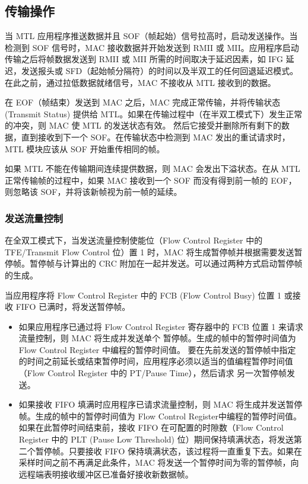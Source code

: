 \documentclass[main\_\_CN.tex]{subfiles}
\begin{document}
\subsection{传输操作}
当 MTL 应用程序推送数据并且 SOF（帧起始）信号拉高时，启动发送操作。当检测到 SOF 信号时，MAC 接收数据并开始发送到 RMII 或 MII。应用程序启动传输之后将帧数据发送到 RMII 或 MII 所需的时间取决于延迟因素，如 IFG 延迟，发送报头或 SFD（起始帧分隔符）的时间以及半双工的任何回退延迟模式。在此之前，通过拉低数据就绪信号，MAC 不接收从 MTL 接收到的数据。

在 EOF（帧结束）发送到 MAC 之后，MAC 完成正常传输，并将传输状态 (Transmit Status) 提供给 MTL。如果在传输过程中（在半双工模式下）发生正常的冲突，则 MAC 使 MTL 的发送状态有效。 然后它接受并删除所有剩下的数据，直到接收到下一个 SOF。在传输状态中检测到 MAC 发出的重试请求时，MTL 模块应该从 SOF 开始重传相同的帧。

如果 MTL 不能在传输期间连续提供数据，则 MAC 会发出下溢状态。在从 MTL 正常传输帧的过程中，如果 MAC 接收到一个 SOF 而没有得到前一帧的 EOF，则忽略该 SOF，并将该新帧视为前一帧的延续。

\subsubsection{发送流量控制 }
在全双工模式下，当发送流量控制使能位（Flow Control Register 中的 TFE/Transmit Flow Control 位）置 1 时，MAC 将生成暂停帧并根据需要发送暂停帧。暂停帧与计算出的 CRC 附加在一起并发送。可以通过两种方式启动暂停帧的生成。

当应用程序将 Flow Control Register 中的 FCB (Flow Control Busy) 位置 1 或接收 FIFO 已满时，将发送暂停帧。

\begin{itemize}
\item 如果应用程序已通过将 Flow Control Register 寄存器中的 FCB 位置 1 来请求流量控制，则 MAC 将生成并发送单个 暂停帧。生成的帧中的暂停时间值为 Flow Control Register 中编程的暂停时间值。 要在先前发送的暂停帧中指定的时间之前延长或结束暂停时间，应用程序必须以适当的值编程暂停时间值（Flow Control Register 中的 PT/Pause Time），然后请求 另一次暂停帧发送。
\item 如果接收 FIFO 填满时应用程序已请求流量控制，则 MAC 将生成并发送暂停帧。生成的帧中的暂停时间值为 Flow Control Register中编程的暂停时间值。如果在此暂停时间结束前，接收 FIFO 在可配置的时隙数（Flow Control Register 中的 PLT (Pause Low Threshold) 位）期间保持填满状态，将发送第二个暂停帧。只要接收 FIFO 保持填满状态，该过程将一直重复下去。如果在采样时间之前不再满足此条件，MAC 将发送一个暂停时间为零的暂停帧，向远程端表明接收缓冲区已准备好接收新数据帧。
\end{itemize}
\end{document}
